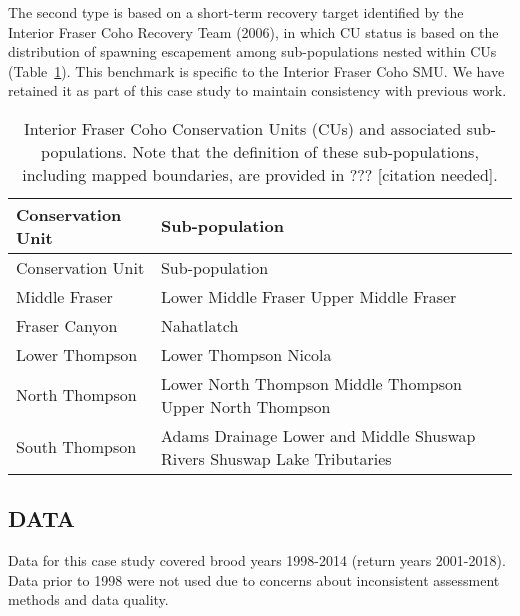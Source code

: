 \documentclass[11pt]{book}
\begin{document}
The second type is based on a short-term recovery target identified by the Interior Fraser Coho Recovery Team (2006), in which CU status is based on the distribution of spawning escapement among sub-populations nested within CUs (Table~\ref{tab:cohoCU2SP}). This benchmark is specific to the Interior Fraser Coho SMU. We have retained it as part of this case study to maintain consistency with previous work.
\begin{longtable}[]{@{}
  >{\raggedright\arraybackslash}p{}
  >{\raggedright\arraybackslash}p{}@{}}
\caption{\label{tab:cohoCU2SP} Interior Fraser Coho Conservation Units (CUs) and associated sub-populations. Note that the definition of these sub-populations, including mapped boundaries, are provided in ??? {[}citation needed{]}.}\tabularnewline
\toprule
Conservation Unit & Sub-population \\
\midrule
\endfirsthead
\toprule
Conservation Unit & Sub-population \\
\midrule
\endhead
Middle Fraser & Lower Middle Fraser Upper Middle Fraser \\
Fraser Canyon & Nahatlatch \\
Lower Thompson & Lower Thompson Nicola \\
North Thompson & Lower North Thompson Middle Thompson Upper North Thompson \\
South Thompson & Adams Drainage Lower and Middle Shuswap Rivers Shuswap Lake Tributaries \\
\bottomrule
\end{longtable}
\hypertarget{data}{%
\subsection{DATA}\label{data}}

Data for this case study covered brood years 1998-2014 (return years 2001-2018). Data prior to 1998 were not used due to concerns about inconsistent assessment methods and data quality.
\end{document}
